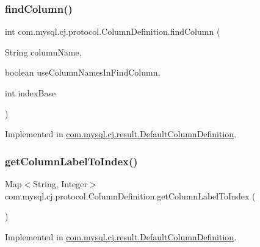 \subsubsection{\texorpdfstring{find\+Column()}{findColumn()}}
{\footnotesize\ttfamily int com.\+mysql.\+cj.\+protocol.\+Column\+Definition.\+find\+Column (\begin{DoxyParamCaption}\item[{String}]{column\+Name,  }\item[{boolean}]{use\+Column\+Names\+In\+Find\+Column,  }\item[{int}]{index\+Base }\end{DoxyParamCaption})}



Implemented in \mbox{\hyperlink{classcom_1_1mysql_1_1cj_1_1result_1_1_default_column_definition_ae73bfdbb03fe73c3a9b7687e4e987500}{com.\+mysql.\+cj.\+result.\+Default\+Column\+Definition}}.

\mbox{\label{interfacecom_1_1mysql_1_1cj_1_1protocol_1_1_column_definition_aa22f404b0faa1f9393ae5c34c2d943df}} 
\subsubsection{\texorpdfstring{get\+Column\+Label\+To\+Index()}{getColumnLabelToIndex()}}
{\footnotesize\ttfamily Map$<$String, Integer$>$ com.\+mysql.\+cj.\+protocol.\+Column\+Definition.\+get\+Column\+Label\+To\+Index (\begin{DoxyParamCaption}{ }\end{DoxyParamCaption})}



Implemented in \mbox{\hyperlink{classcom_1_1mysql_1_1cj_1_1result_1_1_default_column_definition_a625450cf994980769ce878b7e8ede9b3}{com.\+mysql.\+cj.\+result.\+Default\+Column\+Definition}}.

\mbox{\label{interfacecom_1_1mysql_1_1cj_1_1protocol_1_1_column_definition_ad5ae6c46f96994220e21085f7aa00baa}} 
